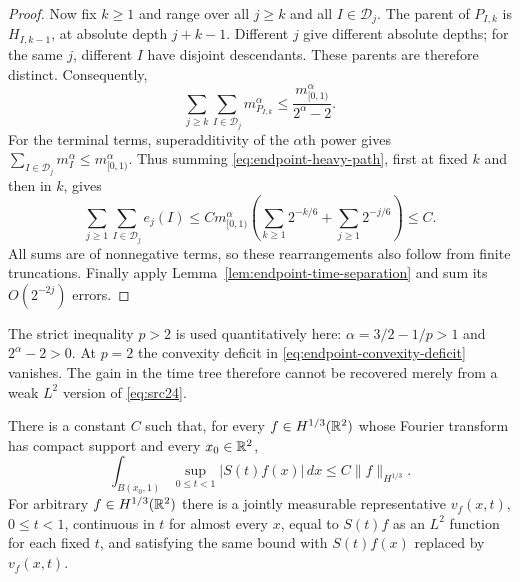\begin{proof}
Now fix $k\ge1$ and range over all $j\ge k$ and all
$I\in\mathcal D_j$.  The parent of $P_{I,k}$ is $H_{I,k-1}$, at absolute
depth $j+k-1$.  Different $j$ give different absolute depths; for the
same $j$, different $I$ have disjoint descendants.  These parents are
therefore distinct.  Consequently,
\[
 \sum_{j\ge k}\sum_{I\in\mathcal D_j}m_{P_{I,k}}^\alpha
      \le \frac{m_{[0,1)}^\alpha}{2^\alpha-2}.
\]
For the terminal terms, superadditivity of the $\alpha$th power gives
$\sum_{I\in\mathcal D_j}m_I^\alpha\le m_{[0,1)}^\alpha$.  Thus summing
\eqref{eq:endpoint-heavy-path}, first at fixed $k$ and then in $k$, gives
\[
 \sum_{j\ge1}\sum_{I\in\mathcal D_j}e_j(I)
 \le C m_{[0,1)}^\alpha
       \left(\sum_{k\ge1}2^{-k/6}+\sum_{j\ge1}2^{-j/6}\right)
 \le C.
\]
All sums are of nonnegative terms, so these rearrangements also follow
from finite truncations.  Finally apply
Lemma~\ref{lem:endpoint-time-separation} and sum its $O(2^{-2j})$ errors.
\end{proof}

\begin{remark}
The strict inequality $p>2$ is used quantitatively here:
$\alpha=3/2-1/p>1$ and $2^\alpha-2>0$.  At $p=2$ the convexity deficit
in \eqref{eq:endpoint-convexity-deficit} vanishes.  The gain in the time
tree therefore cannot be recovered merely from a weak $L^2$ version of
\eqref{eq:src24}.
\end{remark}

\begin{theorem}
\label{thm:maximal}
There is a constant $C$ such that, for every $f\in H^{1/3}(\mathbb R^2)$ whose
Fourier transform has compact support and every $x_0\in\mathbb R^2$,
\begin{equation}
 \int_{B(x_0,1)}\sup_{0\le t<1}|S(t)f(x)|\,dx
       \le C\|f\|_{H^{1/3}}.
 \label{eq:endpoint-strong-maximal}
\end{equation}
For arbitrary $f\in H^{1/3}(\mathbb R^2)$ there is a jointly measurable
representative $v_f(x,t)$, $0\le t<1$, continuous in $t$ for almost every
$x$, equal to $S(t)f$ as an $L^2$ function for each fixed $t$, and satisfying
the same bound with $S(t)f(x)$ replaced by $v_f(x,t)$.
\end{theorem}

